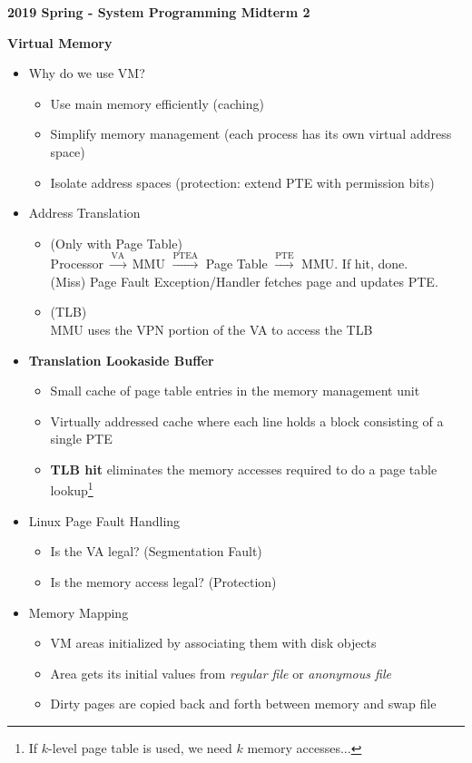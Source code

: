 \documentclass[12pt]{article}
\newcommand{\cname}[1]{\large \textbf{#1}}
\begin{document}
{\sffamily
\begin{center}
	\textbf{\large 2019 Spring - System Programming Midterm 2}
\end{center}
\cname{Virtual Memory}
\begin{itemize}
	\item Why do we use VM?
	\begin{itemize}
		\item Use main memory efficiently (caching)
		\item Simplify memory management (each process has its own virtual address space)
		\item Isolate address spaces (protection: extend PTE with permission bits)
	\end{itemize}
	\item Address Translation
	\begin{itemize}
		\item (Only with Page Table)\\
		Processor $\overset{\text{VA}}{\longrightarrow}$ MMU $\overset{\text{PTEA}}{\longrightarrow}$ Page Table $\overset{\text{PTE}}{\longrightarrow}$ MMU. If hit, done.\\
		(Miss) Page Fault Exception/Handler fetches page and updates PTE.
		\item (TLB)\\
		MMU uses the VPN portion of the VA to access the TLB
	\end{itemize}
	\item \textbf{Translation Lookaside Buffer}
	\begin{itemize}
		\item Small cache of page table entries in the memory management unit
		\item Virtually addressed cache where each line holds a block consisting of a single PTE
		\item \textbf{TLB hit} eliminates the memory accesses required to do a page table lookup\footnote{If $k$-level page table is used, we need $k$ memory accesses...}
	\end{itemize}
	\item Linux Page Fault Handling
	\begin{itemize}
		\item Is the VA legal? (Segmentation Fault)
		\item Is the memory access legal? (Protection)
	\end{itemize}
	\item Memory Mapping
	\begin{itemize}
		\item VM areas initialized by associating them with disk objects
		\item Area gets its initial values from \textit{regular file} or \textit{anonymous file}
		\item Dirty pages are copied back and forth between memory and swap file
	\end{itemize}
\end{itemize}

}
\end{document}
